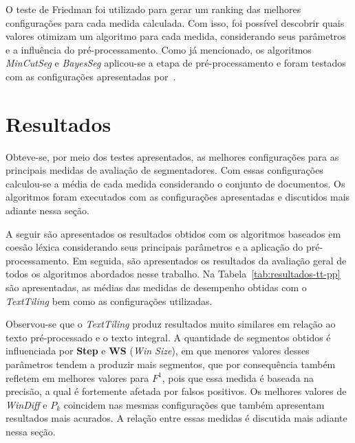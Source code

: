 O teste de Friedman foi utilizado para gerar um ranking das melhores configurações para cada medida calculada. Com isso, foi possível descobrir quais valores otimizam um algoritmo para cada medida, considerando seus parâmetros e a influência do pré-processamento. Como já mencionado, os algoritmos \textit{MinCutSeg} e \textit{BayesSeg} aplicou-se a etapa de pré-processamento e foram testados com as configurações apresentadas por~\cite{Eis2008}. 



\section{Resultados}

Obteve-se, por meio dos testes apresentados, as melhores configurações para as principais medidas de avaliação de segmentadores. Com essas configurações calculou-se a média de cada medida considerando o conjunto de documentos. Os algoritmos foram executados com as configurações apresentadas e discutidos mais adiante nessa seção.

A seguir são apresentados os resultados obtidos com os algoritmos baseados em coesão léxica 
considerando seus principais parâmetros e a aplicação do pré-processamento. Em seguida, são apresentados os resultados da avaliação geral de todos os algoritmos abordados nesse trabalho.
Na Tabela~\ref{tab:resultados-tt-pp} são apresentadas, as médias das medidas de desempenho obtidas com o \textit{TextTiling} bem como as configurações utilizadas.


	  



Observou-se que o \textit{TextTiling} produz resultados muito similares em relação ao texto pré-processado e o texto integral. A quantidade de segmentos obtidos é influenciada por \textbf{Step} e \textbf{WS} (\textit{Win Size}), em que menores valores desses parâmetros tendem a produzir mais segmentos, que por consequência também refletem em melhores valores para $F^1$, pois que essa medida é baseada na precisão, a qual é fortemente afetada por falsos positivos. Os melhores valores de \textit{WinDiff} e $P_k$ coincidem nas mesmas configurações que também apresentam resultados mais acurados. A relação entre essas medidas é discutida mais adiante nessa seção.



